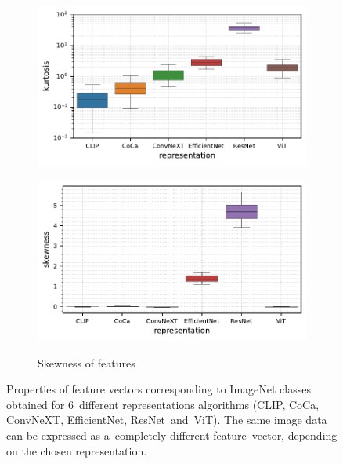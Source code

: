 \begin{figure}[t]
\begin{subfigure}[b]{0.495\textwidth}
        \includegraphics[width=\textwidth]{images/real-characteristics/image/properties-ImageNet-kurt(representation,representation)-representation_CLIP,CoCa,ConvNeXT,EfficientNet,ResNet,ViT-class_0,999-data_ID-train.pdf}
        \label{fig:image-curtosis}
    \end{subfigure}
    \hfill
    \begin{subfigure}[b]{0.495\textwidth}
        \centering
        \caption{\small Skewness of features}
        \includegraphics[width=\textwidth]{images/real-characteristics/image/properties-ImageNet-skew(representation,representation)-representation_CLIP,CoCa,ConvNeXT,EfficientNet,ResNet,ViT-class_0,999-data_ID-train.pdf}
        \label{fig:image-skewness}
    \end{subfigure}
    \caption{Properties of feature vectors corresponding to ImageNet classes obtained for 6~different representations algorithms (CLIP, CoCa, ConvNeXT, EfficientNet, ResNet~and~ViT). The same image data can be expressed as a~completely different feature~vector, depending on the chosen representation.}
    \label{fig:characteristics-image}
\end{figure}

